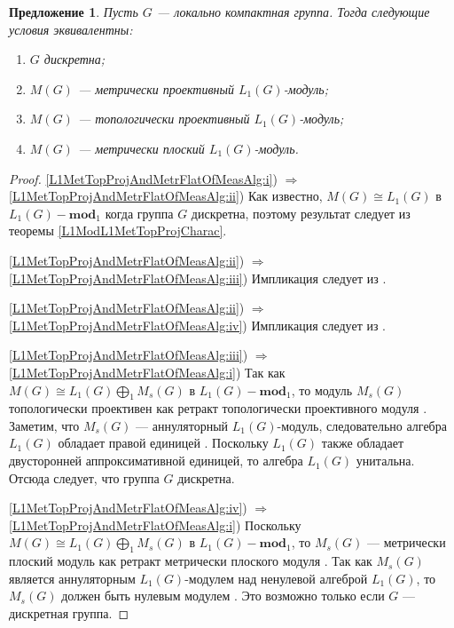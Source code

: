 \documentclass{article}
\numberwithin{equation}{section}
\theoremstyle{plain}
\newtheorem{propos}{Предложение}
\theoremstyle{definition}
\newtheorem{proof}{Доказательство}\def\theproof{}
\newcommand{\isom}{\mathop{\mathbin{\cong}}}
\begin{document}
\begin{fulltext}
\begin{propos}\label{L1MetTopProjAndMetrFlatOfMeasAlg} Пусть $G$ --- локально 
компактная группа. Тогда следующие условия эквивалентны:
\begin{enumerate}
    \item $G$ дискретна;
    \label{L1MetTopProjAndMetrFlatOfMeasAlg:i}
    \item $M(G)$ --- метрически проективный $L_1(G)$-модуль;
    \label{L1MetTopProjAndMetrFlatOfMeasAlg:ii}
    \item $M(G)$ --- топологически проективный $L_1(G)$-модуль;
    \label{L1MetTopProjAndMetrFlatOfMeasAlg:iii}
    \item $M(G)$ --- метрически плоский $L_1(G)$-модуль.
    \label{L1MetTopProjAndMetrFlatOfMeasAlg:iv}
\end{enumerate}
\end{propos}
\begin{proof} 
\ref{L1MetTopProjAndMetrFlatOfMeasAlg:i}) $\Longrightarrow$ 
\ref{L1MetTopProjAndMetrFlatOfMeasAlg:ii}) Как известно, $M(G)\isom L_1(G)$ 
в $L_1(G)-\mathbf{mod}_1$ когда группа $G$ дискретна, поэтому результат 
следует из теоремы \ref{L1ModL1MetTopProjCharac}. 

\ref{L1MetTopProjAndMetrFlatOfMeasAlg:ii}) $\Longrightarrow$ 
\ref{L1MetTopProjAndMetrFlatOfMeasAlg:iii}) Импликация следует из 
\cite[предложение~2.4]{NemGeomProjInjFlatBanMod}.

\ref{L1MetTopProjAndMetrFlatOfMeasAlg:ii}) $\Longrightarrow$ 
\ref{L1MetTopProjAndMetrFlatOfMeasAlg:iv}) Импликация следует из 
\cite[предложение~2.26]{NemGeomProjInjFlatBanMod}.

\ref{L1MetTopProjAndMetrFlatOfMeasAlg:iii}) $\Longrightarrow$ 
\ref{L1MetTopProjAndMetrFlatOfMeasAlg:i}) Так как 
$M(G)\isom L_1(G)\bigoplus_1 M_s(G)$ в $L_1(G)-\mathbf{mod}_1$, то модуль $M_s(G)$ 
топологически проективен как ретракт топологически проективного модуля 
\cite[предложение~2.2]{NemGeomProjInjFlatBanMod}. Заметим, что 
$M_s(G)$ --- аннуляторный $L_1(G)$-модуль, следовательно алгебра $L_1(G)$ 
обладает правой единицей \cite[предложение~3.3]{NemGeomProjInjFlatBanMod}. 
Поскольку $L_1(G)$ также обладает двусторонней аппроксимативной единицей, 
то алгебра $L_1(G)$ унитальна. Отсюда следует, что группа $G$ дискретна.

\ref{L1MetTopProjAndMetrFlatOfMeasAlg:iv}) $\Longrightarrow$ 
\ref{L1MetTopProjAndMetrFlatOfMeasAlg:i}) Поскольку 
$M(G)\isom L_1(G)\bigoplus_1 M_s(G)$ в $L_1(G)-\mathbf{mod}_1$, то 
$M_s(G)$ --- метрически плоский модуль как ретракт метрически плоского 
модуля \cite[предложение~2.27]{NemGeomProjInjFlatBanMod}. Так как $M_s(G)$ 
является аннуляторным $L_1(G)$-модулем над ненулевой алгеброй $L_1(G)$, 
то $M_s(G)$ должен быть нулевым модулем 
\cite[предложение~3.6]{NemGeomProjInjFlatBanMod}. Это возможно только 
если $G$ --- дискретная группа.
\end{proof}


\end{fulltext}
\end{document}
